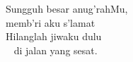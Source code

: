 Sungguh besar anug’rahMu,  \\
memb’ri aku s’lamat \\
Hilanglah jiwaku dulu \\ 
di jalan yang sesat. \\
